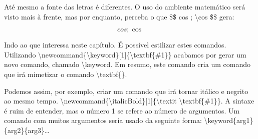 \documentclass[a4paper, 12pt, oneside]{book}
\begin{document}
Até mesmo a fonte das letras é diferentes.
O uso do ambiente matemático será visto mais à frente, mas por enquanto, perceba o que \$\$ cos ; \textbackslash cos \$\$ gera:

$$cos ; \cos$$

Indo ao que interessa neste capítulo.
É possível estilizar estes comandos.
Utilizando \textbackslash newcommand\{\textbackslash keyword\}[1]\{\textbackslash textbf\{\#1\}\} acabamos por gerar um novo comando, chamado \textbackslash keyword.
Em resumo, este comando cria um comando que irá mimetizar o comando \textbackslash textbf\{\}.

Podemos assim, por exemplo, criar um comando que irá tornar itálico e negrito ao mesmo tempo.
\textbackslash newcommand\{\textbackslash italicBold\}[1]\{\textbackslash textit \textbackslash textbf\{\#1\}\}.
A sintaxe é ruim de entender, mas o número 1 se refere ao número de argumentos.
Um comando com muitos argumentos seria usado da seguinte forma: \textbackslash keyword\{arg1\}\{arg2\}\{arg3\}\ldots
\end{document}
